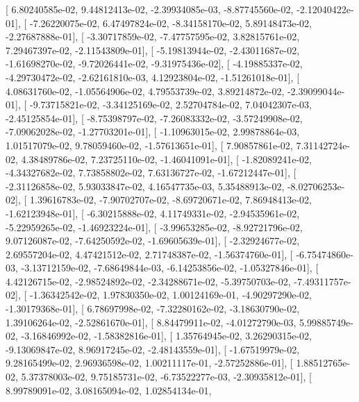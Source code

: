 \documentclass{article}
\begin{document}
       [  6.80240585e-02,   9.44812413e-02,  -2.39934085e-03,
         -8.87745560e-02,  -2.12040422e-01],
       [ -7.26220075e-02,   6.47497824e-02,  -8.34158170e-02,
          5.89148473e-02,  -2.27687888e-01],
       [ -3.30717859e-02,  -7.47757595e-02,   3.82815761e-02,
          7.29467397e-02,  -2.11543809e-01],
       [ -5.19813944e-02,  -2.43011687e-02,  -1.61698270e-02,
         -9.72026441e-02,  -9.31975436e-02],
       [ -4.19885337e-02,  -4.29730472e-02,  -2.62161810e-03,
          4.12923804e-02,  -1.51261018e-01],
       [  4.08631760e-02,  -1.05564906e-02,   4.79553739e-02,
          3.89214872e-02,  -2.39099044e-01],
       [ -9.73715821e-02,  -3.34125169e-02,   2.52704784e-02,
          7.04042307e-03,  -2.45125854e-01],
       [ -8.75398797e-02,  -7.26083332e-02,  -3.57249908e-02,
         -7.09062028e-02,  -1.27703201e-01],
       [ -1.10963015e-02,   2.99878864e-03,   1.01517079e-02,
          9.78059460e-02,  -1.57613651e-01],
       [  7.90857861e-02,   7.31142724e-02,   4.38489786e-02,
          7.23725110e-02,  -1.46041091e-01],
       [ -1.82089241e-02,  -4.34327682e-02,   7.73858802e-02,
          7.63136727e-02,  -1.67212447e-01],
       [ -2.31126858e-02,   5.93033847e-02,   4.16547735e-03,
          5.35488913e-02,  -8.02706253e-02],
       [  1.39616783e-02,  -7.90702707e-02,  -8.69720671e-02,
          7.86948413e-02,  -1.62123948e-01],
       [ -6.30215888e-02,   4.11749331e-02,  -2.94535961e-02,
         -5.22959265e-02,  -1.46923224e-01],
       [ -3.99653285e-02,  -8.92721796e-02,   9.07126087e-02,
         -7.64250592e-02,  -1.69605639e-01],
       [ -2.32924677e-02,   2.69557204e-02,   4.47421512e-02,
          2.71748387e-02,  -1.56374760e-01],
       [ -6.75474860e-03,  -3.13712159e-02,  -7.68649844e-03,
         -6.14253856e-02,  -1.05327846e-01],
       [  4.42126715e-02,  -2.98524892e-02,  -2.34288671e-02,
         -5.39750703e-02,  -7.49311757e-02],
       [ -1.36342542e-02,   1.97830350e-02,   1.00124169e-01,
         -4.90297290e-02,  -1.30179368e-01],
       [  6.78697998e-02,  -7.32280162e-02,  -3.18630790e-02,
          1.39106264e-02,  -2.52861670e-01],
       [  8.84479911e-02,  -4.01272790e-03,   5.99885749e-02,
         -3.16846992e-02,  -1.58382816e-01],
       [  1.35764945e-02,   3.26290315e-02,  -9.13069847e-02,
          8.96917245e-02,  -2.48143559e-01],
       [ -1.67519979e-02,   9.28165499e-02,   2.96936598e-02,
          1.00211117e-01,  -2.57252886e-01],
       [  1.88512765e-02,   5.37378003e-02,   9.75185731e-02,
         -6.73522277e-03,  -2.30935812e-01],
       [  8.99789091e-02,   3.08165094e-02,   1.02854134e-01,
\end{document}
